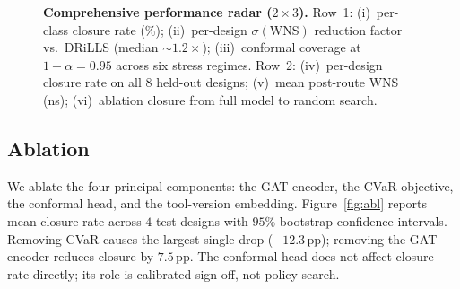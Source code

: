\documentclass[journal]{IEEEtran}
\begin{document}
\begin{figure}[t]
\caption{\textbf{Comprehensive performance radar ($2\times 3$).}
Row~1: (i)~per-class closure rate (\%); (ii)~per-design $\sigma(\mathrm{WNS})$ reduction factor vs.\ DRiLLS (median $\sim 1.2\times$); (iii)~conformal coverage at $1{-}\alpha{=}0.95$ across six stress regimes.
Row~2: (iv)~per-design closure rate on all $8$ held-out designs; (v)~mean post-route WNS (ns); (vi)~ablation closure from full model to random search.}
\label{fig:radar}
\end{figure}

\subsection{Ablation}
\label{sec:ablation}

We ablate the four principal components: the GAT encoder, the CVaR objective, the conformal head, and the tool-version embedding. Figure~\ref{fig:abl} reports mean closure rate across $4$ test designs with $95\%$ bootstrap confidence intervals. Removing CVaR causes the largest single drop ($-12.3$\,pp); removing the GAT encoder reduces closure by $7.5$\,pp. The conformal head does not affect closure rate directly; its role is calibrated sign-off, not policy search.
\end{document}
